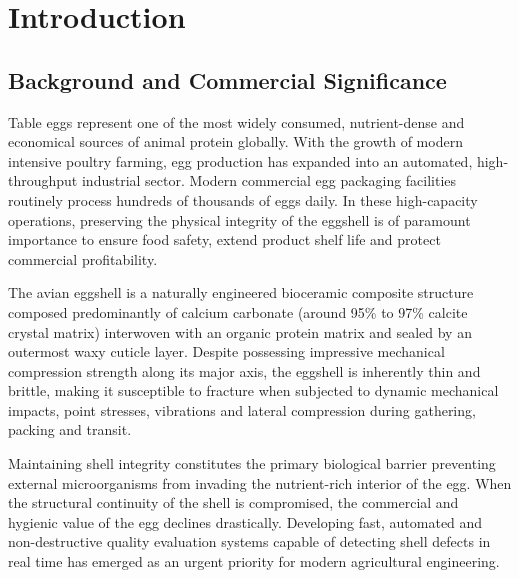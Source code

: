 \documentclass[12pt,a4paper]{report}
\begin{document}
\clearpage


\setcounter{page}{1}


\chapter{Introduction}

\section{Background and Commercial Significance}

Table eggs represent one of the most widely consumed, nutrient-dense and economical sources of animal protein globally. With the growth of modern intensive poultry farming, egg production has expanded into an automated, high-throughput industrial sector. Modern commercial egg packaging facilities routinely process hundreds of thousands of eggs daily. In these high-capacity operations, preserving the physical integrity of the eggshell is of paramount importance to ensure food safety, extend product shelf life and protect commercial profitability.

The avian eggshell is a naturally engineered bioceramic composite structure composed predominantly of calcium carbonate (around 95\% to 97\% calcite crystal matrix) interwoven with an organic protein matrix and sealed by an outermost waxy cuticle layer. Despite possessing impressive mechanical compression strength along its major axis, the eggshell is inherently thin and brittle, making it susceptible to fracture when subjected to dynamic mechanical impacts, point stresses, vibrations and lateral compression during gathering, packing and transit.

Maintaining shell integrity constitutes the primary biological barrier preventing external microorganisms from invading the nutrient-rich interior of the egg. When the structural continuity of the shell is compromised, the commercial and hygienic value of the egg declines drastically. Developing fast, automated and non-destructive quality evaluation systems capable of detecting shell defects in real time has emerged as an urgent priority for modern agricultural engineering.
\end{document}
